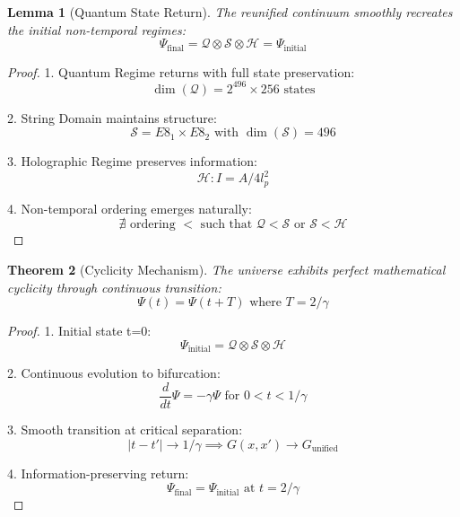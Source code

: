 \documentclass{article}
\newtheorem{theorem}{Theorem}
\newtheorem{lemma}[theorem]{Lemma}
\begin{document}
\begin{lemma}[Quantum State Return]
The reunified continuum smoothly recreates the initial non-temporal regimes:
\begin{equation}
\Psi_{\text{final}} = \mathcal{Q} \otimes \mathcal{S} \otimes \mathcal{H} = \Psi_{\text{initial}}
\end{equation}
\end{lemma}

\begin{proof}
1. Quantum Regime returns with full state preservation:
   \begin{equation}
   \dim(\mathcal{Q}) = 2^{496} \times 256 \text{ states}
   \end{equation}

2. String Domain maintains structure:
   \begin{equation}
   \mathcal{S} = E8_1 \times E8_2 \text{ with } \dim(\mathcal{S}) = 496
   \end{equation}

3. Holographic Regime preserves information:
   \begin{equation}
   \mathcal{H}: I = A/4l_{p}^2
   \end{equation}

4. Non-temporal ordering emerges naturally:
   \begin{equation}
   \nexists \text{ ordering } < \text{ such that } \mathcal{Q} < \mathcal{S} \text{ or } \mathcal{S} < \mathcal{H}
   \end{equation}
\end{proof}

\begin{theorem}[Cyclicity Mechanism]
The universe exhibits perfect mathematical cyclicity through continuous transition:
\begin{equation}
\Psi(t) = \Psi(t + T) \text{ where } T = 2/\gamma
\end{equation}
\end{theorem}

\begin{proof}
1. Initial state t=0:
   \begin{equation}
   \Psi_{\text{initial}} = \mathcal{Q} \otimes \mathcal{S} \otimes \mathcal{H}
   \end{equation}

2. Continuous evolution to bifurcation:
   \begin{equation}
   \frac{d}{dt}\Psi = -\gamma\Psi \text{ for } 0 < t < 1/\gamma
   \end{equation}

3. Smooth transition at critical separation:
   \begin{equation}
   |t-t'| \to 1/\gamma \implies G(x,x') \to G_{\text{unified}}
   \end{equation}

4. Information-preserving return:
   \begin{equation}
   \Psi_{\text{final}} = \Psi_{\text{initial}} \text{ at } t = 2/\gamma
   \end{equation}
\end{proof}
\end{document}
